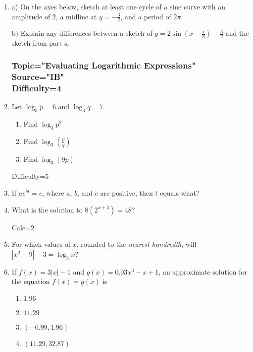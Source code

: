 \documentclass[12pt, oneside]{article}
\begin{document}
\begin{enumerate}
\item a) On the axes below, sketch at least one cycle of a sine curve with an amplitude of 2, a midline at $\displaystyle y = -\frac{3}{2}$, and a period of $2\pi$. 
\begin{center}
\end{center}
b) Explain any differences between a sketch of $\displaystyle y = 2 \sin \left( x- \frac{\pi}{3} \right) -\frac{3}{2}$ and the sketch from part $a$. %

\subsubsection*{Topic="Evaluating Logarithmic Expressions"\\
Source="IB"\\
Difficulty=4}


\item Let $\log_3 p = 6$ and $\log_3 q = 7$.
\begin{enumerate}
    \item Find $\log_3 {p^2}$
    \item Find $\displaystyle \log_3 {\left( \frac{p}{q} \right) }$
    \item Find $\log_3 {(9p)}$
\end{enumerate}

Difficulty=5
\item If $ae^{bt}=c$, where $a$, $b$, and $c$ are positive, then $t$ equals what? %

\item What is the solution to $8(2^{x+3})=48$? %

Calc=2
\item For which values of $x$, rounded to the \emph{nearest hundredth}, will $|x^2-9|-3= \log_3 x$?  %

\item If $f(x)=3|x| -1$ and $g(x)= 0.03x^3 -x +1$, an approximate solution for the equation $f(x)= g(x)$ is
\begin{enumerate}
    \item $1.96$
    \item $11.29$
    \item $(-0.99, 1.96)$
    \item $(11.29, 32.87)$
\end{enumerate}


\end{enumerate}
\end{document}
